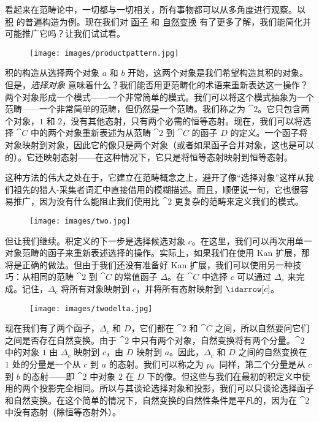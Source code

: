 
\lettrine[lhang=0.17]{看}{起来在范畴论中}，一切都与一切相关，所有事物都可以从多角度进行观察。以 \hyperref[products-and-coproducts]{积} 的普遍构造为例。现在我们对 \hyperref[functors]{函子} 和 \hyperref[natural-transformations]{自然变换} 有了更多了解，我们能简化并可能推广它吗？让我们试试看。

\begin{figure}[H]
  \centering
  \texttt{[image: images/productpattern.jpg]}
\end{figure}

\noindent
积的构造从选择两个对象 $a$ 和 $b$ 开始，这两个对象是我们希望构造其积的对象。但是，\emph{选择对象} 意味着什么？我们能否用更范畴化的术语来重新表达这一操作？两个对象形成一个模式——一个非常简单的模式。我们可以将这个模式抽象为一个范畴——一个非常简单的范畴，但仍然是一个范畴。我们称之为 $\cat{2}$。它只包含两个对象，$1$ 和 $2$，没有其他态射，只有两个必需的恒等态射。现在，我们可以将选择 $\cat{C}$ 中的两个对象重新表述为从范畴 $\cat{2}$ 到 $\cat{C}$ 的函子 $D$ 的定义。一个函子将对象映射到对象，因此它的像只是两个对象（或者如果函子合并对象，这也是可以的）。它还映射态射——在这种情况下，它只是将恒等态射映射到恒等态射。

这种方法的伟大之处在于，它建立在范畴概念之上，避开了像“选择对象”这样从我们祖先的猎人-采集者词汇中直接借用的模糊描述。而且，顺便说一句，它也很容易推广，因为没有什么能阻止我们使用比 $\cat{2}$ 更复杂的范畴来定义我们的模式。

\begin{figure}[H]
  \centering
  \texttt{[image: images/two.jpg]}
\end{figure}

\noindent
但让我们继续。积定义的下一步是选择候选对象 $c$。在这里，我们可以再次用单一对象范畴的函子来重新表述选择的操作。实际上，如果我们在使用 Kan 扩展，那将是正确的做法。但由于我们还没有准备好 Kan 扩展，我们可以使用另一种技巧：从相同的范畴 $\cat{2}$ 到 $\cat{C}$ 的常值函子 $\Delta$。在 $\cat{C}$ 中选择 $c$ 可以通过 $\Delta_c$ 来完成。记住，$\Delta_c$ 将所有对象映射到 $c$，并将所有态射映射到 $\idarrow[c]$。

\begin{figure}[H]
  \centering
  \texttt{[image: images/twodelta.jpg]}
\end{figure}

\noindent
现在我们有了两个函子，$\Delta_c$ 和 $D$，它们都在 $\cat{2}$ 和 $\cat{C}$ 之间，所以自然要问它们之间是否存在自然变换。由于 $\cat{2}$ 中只有两个对象，自然变换将有两个分量。$\cat{2}$ 中的对象 $1$ 由 $\Delta_c$ 映射到 $c$，由 $D$ 映射到 $a$。因此，$\Delta_c$ 和 $D$ 之间的自然变换在 $1$ 处的分量是一个从 $c$ 到 $a$ 的态射。我们可以称之为 $p$。同样，第二个分量是从 $c$ 到 $b$ 的态射——即 $\cat{2}$ 中对象 $2$ 在 $D$ 下的像。但这些与我们在最初的积定义中使用的两个投影完全相同。所以与其谈论选择对象和投影，我们可以只谈论选择函子和自然变换。在这个简单的情况下，自然变换的自然性条件是平凡的，因为在 $\cat{2}$ 中没有态射（除恒等态射外）。

